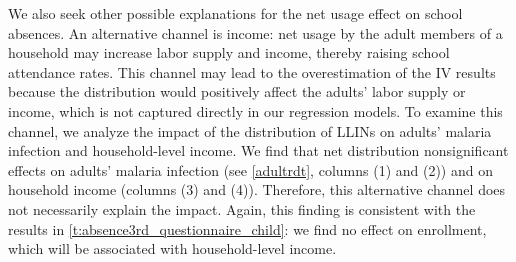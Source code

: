 \documentclass[fleqn,11pt]{article}
\begin{document}
We also seek other possible explanations for the net usage effect on school absences. 
An alternative channel is income: net usage by the adult members of a household may increase labor supply and income, thereby raising school attendance rates. This channel may lead to the overestimation of the IV results because the distribution would positively affect the adults' labor supply or income, which is not captured directly in our regression models. To examine this channel, we analyze the impact of the distribution of LLINs on adults' malaria infection and household-level income. We find that net distribution nonsignificant effects on adults' malaria infection (see \autoref{adultrdt}, columns (1) and (2)) and on household income (columns (3) and (4)). Therefore, this alternative channel does not necessarily explain the impact. Again, this finding is consistent with the results in \autoref{t:absence3rd_questionnaire_child}: we find no effect on enrollment, which will be associated with household-level income.
\end{document}
